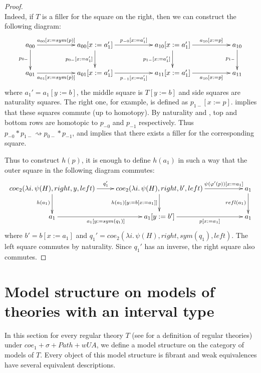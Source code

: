 \documentclass{mscs}
\newcommand{\repl}{:=}
\newcommand{\idtype}{\rightsquigarrow}
\numberwithin{figure}{section}
\begin{document}
\begin{proof}
\[{            } \]
Indeed, if $T$ is a filler for the square on the right, then we can construct the following diagram:
\[ \xymatrix{ a_{00} \ar[rr]^-{a_{00}[x \repl sym(p)]} \ar[d]_{p_{0-}} & & a_{00}[x \repl a_1'] \ar[rr]^{p_{-0}[x \repl a_1']} \ar[d]_{p_{0-}[x \repl a_1']} & & a_{10}[x \repl a_1'] \ar[d]_{p_{1-}[x \repl a_1']} \ar[rr]^-{a_{10}[x \repl p]} & & a_{10} \ar[d]_{p_{1-}} \\
              a_{01} \ar[rr]_-{a_{01}[x \repl sym(p)]}                 & & a_{01}[x \repl a_1'] \ar[rr]_{p_{-1}[x \repl a_1']}                               & & a_{11}[x \repl a_1']                               \ar[rr]_-{a_{10}[x \repl p]} & & a_{11}
            } \]
where $a_1' = a_1[y \repl b]$, the middle square is $T[y \repl b]$ and side squares are naturality squares.
The right one, for example, is defined as $p_{1-}[x \repl p]$.
 implies that these squares commute (up to homotopy).
By naturality and , top and bottom rows are homotopic to $p_{-0}$ and $p_{-1}$ respectively.
Thus $p_{-0} * p_{1-} \idtype p_{0-} * p_{-1}$, and  implies that there exists a filler for the corresponding square.

Thus to construct $h(p)$, it is enough to define $h(a_1)$ in such a way that the outer square in the following diagram commutes:
\[ \xymatrix{ coe_2(\lambda i.\,\psi(H), right, y, left) \ar[r]^{q_1'} \ar[d]_{h(a_1)} & coe_2(\lambda i.\,\psi(H), right, b', left) \ar[rr]^-{\psi(\varphi'(p))[x \repl a_1]} \ar[d]_{h(a_1)[y \repl b[x \repl a_1]]} & & a_1 \ar[d]_{refl(a_1)} \\
              a_1 \ar[r]_{a_1[y \repl sym(q_1)]} & a_1[y \repl b'] \ar[rr]_-{p[x \repl a_1]}                                                                                                                           & & a_1
            } \]
where $b' = b[x \repl a_1]$ and $q_1' = coe_2(\lambda i.\,\psi(H), right, sym(q_1), left)$.
The left square commutes by naturality.
Since $q_1'$ has an inverse, the right square also commutes.
\end{proof}

\section{Model structure on models of theories with an interval type}
\label{sec:model-structure}

In this section for every regular theory $T$ (see \cite{alg-tt} for a definition of regular theories)
under $coe_1 + \sigma + Path + wUA$, we define a model structure on the category of models of $T$.
Every object of this model structure is fibrant and weak equivalences have several equivalent descriptions.
\end{document}
